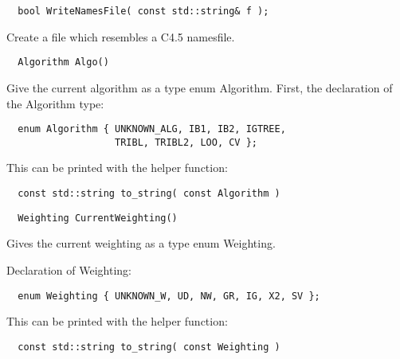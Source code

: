 \documentclass{report}
\begin{document}
\begin{footnotesize}
\begin{verbatim}
  bool WriteNamesFile( const std::string& f );
\end{verbatim}
\end{footnotesize}

Create a file which resembles a C4.5 namesfile.

\begin{footnotesize}
\begin{verbatim}
  Algorithm Algo()
\end{verbatim}
\end{footnotesize}

Give the current algorithm as a type enum Algorithm. First, the
declaration of the Algorithm type:

\begin{footnotesize}
\begin{verbatim}
  enum Algorithm { UNKNOWN_ALG, IB1, IB2, IGTREE, 
                   TRIBL, TRIBL2, LOO, CV };
\end{verbatim}
\end{footnotesize}

This can be printed with the helper function: 

\begin{footnotesize}
\begin{verbatim}
  const std::string to_string( const Algorithm )
\end{verbatim}
\end{footnotesize}

\begin{footnotesize}
\begin{verbatim}
  Weighting CurrentWeighting()
\end{verbatim}
\end{footnotesize}

Gives the current weighting as a type enum Weighting.

Declaration of Weighting:

\begin{footnotesize}
\begin{verbatim}
  enum Weighting { UNKNOWN_W, UD, NW, GR, IG, X2, SV };
\end{verbatim}
\end{footnotesize}

This can be printed with the helper function: 

\begin{footnotesize}
\begin{verbatim}
  const std::string to_string( const Weighting )
\end{verbatim}
\end{footnotesize}
\end{document}
